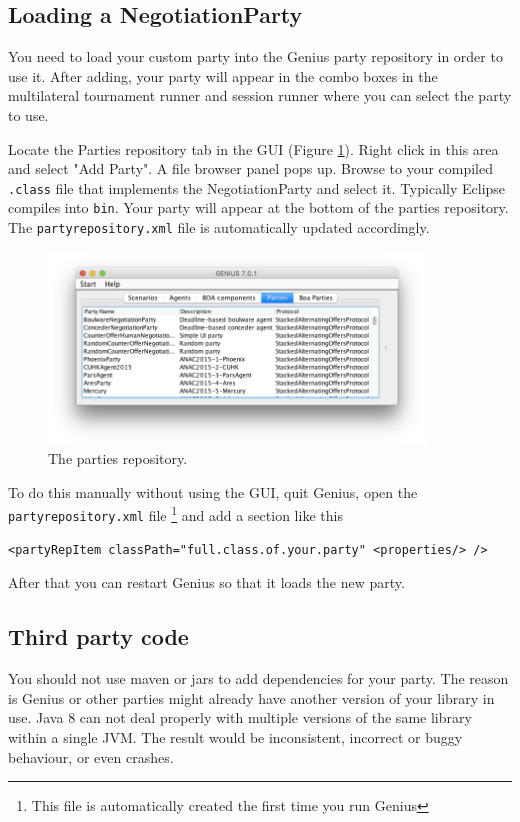 \documentclass[]{article}
\newcommand\Genius{{\sc Genius}}
\begin{document}
\subsection{Loading a NegotiationParty}

You need to load your custom party into the {\Genius} party repository in order to use it. After adding, your party will appear in the combo boxes in the multilateral tournament runner and session runner where you can select the party to use.

Locate the Parties repository tab in the GUI (Figure \ref{fig:partiesrepo}). Right click in this area and select "Add Party". A file browser panel pops up. Browse to  your compiled \verb|.class| file that implements the NegotiationParty and select it. Typically Eclipse compiles into \verb|bin|. Your party will appear at the bottom of the parties repository. The \verb|partyrepository.xml| file is automatically updated accordingly.

\begin{figure}[h!] 
	\center
	\includegraphics[width=10cm]{media/partiesrepo.png}
	\caption{The parties repository.}
	\label{fig:partiesrepo}
\end{figure}


To do this manually without using the GUI, quit {\Genius}, open the \verb|partyrepository.xml| file \footnote{This file is automatically created the first time you run {\Genius}}  and add a section like this

\begin{lstlisting}
<partyRepItem classPath="full.class.of.your.party" <properties/> />
\end{lstlisting}

After that you can restart {\Genius} so that it loads the new party.
\FloatBarrier

\subsection{Third party code}
You should not use maven or jars to add dependencies for your party. The reason is {\Genius} or other parties might already have another version of your library in use. Java 8 can not deal properly with multiple versions of the same library within a single JVM. The result would be inconsistent, incorrect or buggy behaviour, or even crashes.
\end{document}
